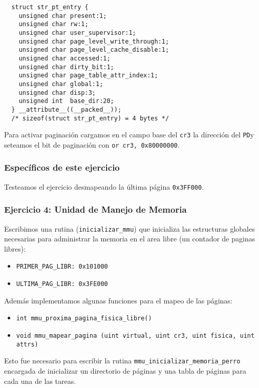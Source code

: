 \documentclass[twocolumn,10pt]{article}
\newcommand{\PD}{\texttt{PD}}
\begin{document}
\begin{lstlisting}
  struct str_pt_entry {
    unsigned char present:1;
    unsigned char rw:1;
    unsigned char user_supervisor:1;
    unsigned char page_level_write_through:1;
    unsigned char page_level_cache_disable:1;
    unsigned char accessed:1;
    unsigned char dirty_bit:1;
    unsigned char page_table_attr_index:1;
    unsigned char global:1;
    unsigned char disp:3;
    unsigned int  base_dir:20;
  } __attribute__((__packed__));
  /* sizeof(struct str_pt_entry) = 4 bytes */
\end{lstlisting}

Para activar paginación cargamos en el campo base del \texttt{cr3} la
dirección del \PD y seteamos el bit de paginación con \texttt{or cr3,
  0x80000000}.

\subsubsection*{Específicos de este ejercicio}
Testeamos el ejercicio desmapeando la última página
\texttt{0x3FF000}.


\subsubsection{Ejercicio 4: Unidad de Manejo de Memoria}

Escribimos una rutina (\texttt{inicializar\_mmu}) que inicializa las
estructuras globales necesarias para administrar la memoria en el area
libre (un contador de paginas libres):

\begin{itemize}
\item \texttt{PRIMER\_PAG\_LIBR: 0x101000}
\item \texttt{ULTIMA\_PAG\_LIBR: 0x3FE000}
\end{itemize}

Además implementamos algunas funciones para el mapeo de las
páginas:

\begin{itemize} 
\item \texttt{int mmu\_proxima\_pagina\_fisica\_libre()}
\item \texttt{void mmu\_mapear\_pagina (uint virtual, uint cr3, uint fisica, uint attrs)}
\end{itemize}

Esto fue necesario para escribir la rutina
\texttt{mmu\_inicializar\_memoria\_perro} encargada de inicializar un
directorio de páginas y una tabla de páginas para cada una de las
tareas.
\end{document}
